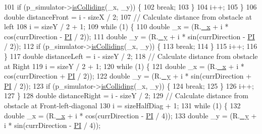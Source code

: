 \begin{DoxyCode}
101       \textcolor{keywordflow}{if} (p\_simulator->\hyperlink{classRobotSimulator_a564d79ead199c034841eda1b3ebebfcd}{isColliding}(\_x, \_y)) \{
102         \textcolor{keywordflow}{break};
103       \}
104       i++;
105     \}
106     \textcolor{keywordtype}{double} distanceFront = i - sizeX / 2;
107     \textcolor{comment}{//  Calculate distance from obstacle at left}
108     i = sizeY / 2 + 1;
109     \textcolor{keywordflow}{while} (1) \{
110       \textcolor{keywordtype}{double} \_x = (R.\hyperlink{structPoint_a77b9bd094b57efb7c185fdb3fb781900}{\_x} + i * cos(currDirection - \hyperlink{Actor_8hpp_a598a3330b3c21701223ee0ca14316eca}{PI} / 2));
111       \textcolor{keywordtype}{double} \_y = (R.\hyperlink{structPoint_aa8be383c30dee092979999b523373658}{\_y} + i * sin(currDirection - \hyperlink{Actor_8hpp_a598a3330b3c21701223ee0ca14316eca}{PI} / 2));
112       \textcolor{keywordflow}{if} (p\_simulator->\hyperlink{classRobotSimulator_a564d79ead199c034841eda1b3ebebfcd}{isColliding}(\_x, \_y)) \{
113         \textcolor{keywordflow}{break};
114       \}
115       i++;
116     \}
117     \textcolor{keywordtype}{double} distanceLeft = i - sizeY / 2;
118     \textcolor{comment}{//  Calculate distance from obstacle at Right}
119     i = sizeY / 2 + 1;
120     \textcolor{keywordflow}{while} (1) \{
121       \textcolor{keywordtype}{double} \_x = (R.\hyperlink{structPoint_a77b9bd094b57efb7c185fdb3fb781900}{\_x} + i * cos(currDirection + \hyperlink{Actor_8hpp_a598a3330b3c21701223ee0ca14316eca}{PI} / 2));
122       \textcolor{keywordtype}{double} \_y = (R.\hyperlink{structPoint_aa8be383c30dee092979999b523373658}{\_y} + i * sin(currDirection + \hyperlink{Actor_8hpp_a598a3330b3c21701223ee0ca14316eca}{PI} / 2));
123       \textcolor{keywordflow}{if} (p\_simulator->\hyperlink{classRobotSimulator_a564d79ead199c034841eda1b3ebebfcd}{isColliding}(\_x, \_y)) \{
124         \textcolor{keywordflow}{break};
125       \}
126       i++;
127     \}
128     \textcolor{keywordtype}{double} distanceRight = i - sizeY / 2;
129     \textcolor{comment}{//  Calculate distance from obstacle at Front-left-diagonal}
130     i = sizeHalfDiag  + 1;
131     \textcolor{keywordflow}{while} (1) \{
132       \textcolor{keywordtype}{double} \_x = (R.\hyperlink{structPoint_a77b9bd094b57efb7c185fdb3fb781900}{\_x} + i * cos(currDirection - \hyperlink{Actor_8hpp_a598a3330b3c21701223ee0ca14316eca}{PI} / 4));
133       \textcolor{keywordtype}{double} \_y = (R.\hyperlink{structPoint_aa8be383c30dee092979999b523373658}{\_y} + i * sin(currDirection - \hyperlink{Actor_8hpp_a598a3330b3c21701223ee0ca14316eca}{PI} / 4));

\end{DoxyCode}
